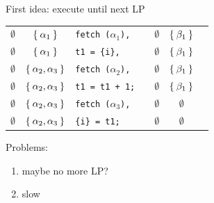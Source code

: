 \documentclass{beamer}
\begin{document}
\begin{frame}
First idea: execute until next LP
\begin{center}
	\begin{tabular}{ccl||lccc}
		$\emptyset$ & $\Set{\alpha_1}$ & \texttt{fetch ($\alpha_1$),} & & $\emptyset$ &  $\Set{\beta_1}$%
		\\ $\emptyset$ & $\Set{\alpha_1}$ & \texttt{t1 = \{i\}{\color{red},}} & & $\emptyset$ &  $\Set{\beta_1}$%
		\\ $\emptyset$ & $\Set{\alpha_2, \alpha_3}$ & \color{red}\texttt{fetch  ($\alpha_2$),} & & $\emptyset$ &  $\Set{\beta_1}$%
		\\ $\emptyset$ & $\Set{\alpha_2, \alpha_3}$ & \color{red}\texttt{t1 = t1 + 1;} & & $\emptyset$ &  $\Set{\beta_1}$%
		\\[4pt] $\emptyset$ & $\Set{\alpha_2, \alpha_3}$ & \color{red}\texttt{fetch ($\alpha_3$),} & & $\emptyset$ &  $\emptyset$%
		\\ $\emptyset$ & $\Set{\alpha_2, \alpha_3}$ & \texttt{{\color{red}\{i\} = t1};} & & $\emptyset$ &  $\emptyset$&
	\end{tabular}  
\end{center}

Problems: 
\begin{enumerate} 
	\item maybe no more LP?
	\item slow
\end{enumerate}
\end{frame}
\end{document}
